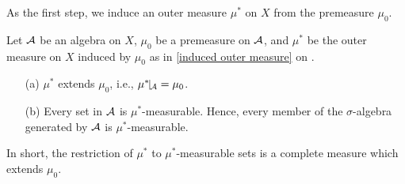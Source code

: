 As the first step, we induce an outer measure $\mu^*$ on $X$ from the premeasure $\mu_0$.
\begin{prop}\label{extension of a premeasure}
    Let ${\mathcal{A}}$ be an algebra on $X$, $\mu_0$ be a premeasure on ${\mathcal{A}}$, and $\mu^*$ be the outer measure on $X$ induced by $\mu_0$ as in \cref{induced outer measure} on .
    \begin{enumerate}
        \item[(a)]
        {
            $\mu^*$ extends $\mu_0$, i.e., $\mu^*\vline_\mc{A}=\mu_0$.
        }
        \item[(b)]
        {
            Every set in ${\mathcal{A}}$ is $\mu^*$-measurable.
            Hence, every member of the $\sigma$-algebra generated by ${\mathcal{A}}$ is $\mu^*$-measurable.
        }
    \end{enumerate}
    In short, the restriction of $\mu^*$ to $\mu^*$-measurable sets is a complete measure which extends $\mu_0$.
\end{prop}
